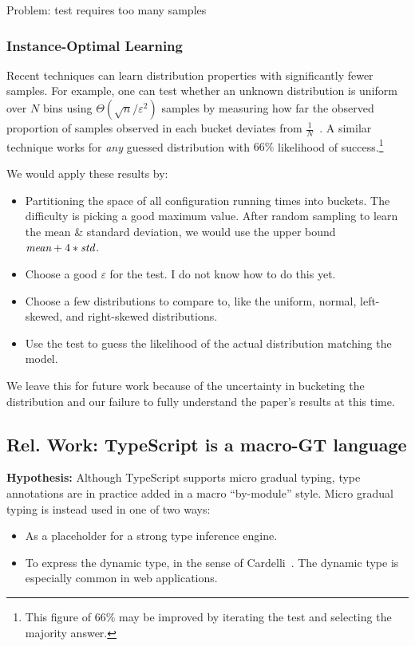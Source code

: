 \documentclass{article}
\begin{document}
Problem: test requires too many samples

\subsubsection*{Instance-Optimal Learning}

Recent techniques can learn distribution properties with significantly fewer samples.
For example, one can test whether an unknown distribution is uniform over $N$ bins using $\Theta(\sqrt{n}/\varepsilon^2)$ samples by measuring how far the observed proportion of samples observed in each bucket deviates from $\frac{1}{N}$~\cite{todo}.
A similar technique works for \emph{any} guessed distribution with $66\%$ likelihood of success.\footnote{This figure of $66\%$ may be improved by iterating the test and selecting the majority answer.}

We would apply these results by:
\begin{itemize}
\item
  Partitioning the space of all configuration running times into buckets.
  The difficulty is picking a good maximum value.
  After random sampling to learn the mean \& standard deviation, we would use the upper bound $\emph{mean} + 4 * \emph{std}$.
\item
  Choose a good $\varepsilon$ for the test.
  I do not know how to do this yet.
\item
  Choose a few distributions to compare to, like the uniform, normal, left-skewed, and right-skewed distributions.
\item
  Use the test to guess the likelihood of the actual distribution matching the model.
\end{itemize}
We leave this for future work because of the uncertainty in bucketing the distribution and our failure to fully understand the paper's results at this time.


\subsection{Rel. Work: TypeScript is a macro-GT language}
\textbf{Hypothesis:}
Although TypeScript supports micro gradual typing, type annotations are in practice added in a macro ``by-module'' style.
Micro gradual typing is instead used in one of two ways:
\begin{itemize}
\item As a placeholder for a strong type inference engine.
\item To express the dynamic type, in the sense of Cardelli~\cite{todo}.
  The dynamic type is especially common in web applications.
\end{itemize}
\end{document}
